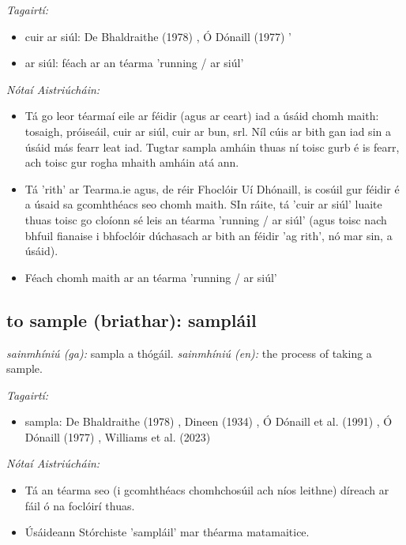 \documentclass{article}
\begin{document}
 \noindent \textit{Tagairtí:}
\begin{itemize}
	\item cuir ar siúl: De Bhaldraithe (1978) \cite{de-bhaldraithe}, Ó Dónaill (1977) \cite{odonaill}'
	\item ar siúl: féach ar an téarma 'running / ar siúl'
\end{itemize}

 \noindent \textit{Nótaí Aistriúcháin:}
\begin{itemize}
	\item Tá go leor téarmaí eile ar féidir (agus ar ceart) iad a úsáid chomh maith: tosaigh, próiseáil, cuir ar siúl, cuir ar bun, srl. Níl cúis ar bith gan iad sin a úsáid más fearr leat iad. Tugtar sampla amháin thuas ní toisc gurb é is fearr, ach toisc gur rogha mhaith amháin atá ann.
	\item Tá 'rith' ar Tearma.ie agus, de réir Fhoclóir Uí Dhónaill, is cosúil gur féidir é a úsaid sa gcomhthéacs seo chomh maith. SIn ráite, tá 'cuir ar siúl' luaite thuas toisc go cloíonn sé leis an téarma 'running / ar siúl' (agus toisc nach bhfuil fianaise i bhfoclóir dúchasach ar bith an féidir 'ag rith', nó mar sin, a úsáid).
	\item Féach chomh maith ar an téarma 'running / ar siúl'
\end{itemize}


\subsection*{to sample (briathar): sampláil} 
 \noindent \textit{sainmhíniú (ga):} sampla a thógáil.
\newline\newline
 \noindent \textit{sainmhíniú (en):} the process of taking a sample.
\newline

 \noindent \textit{Tagairtí:}
\begin{itemize}
	\item sampla: De Bhaldraithe (1978) \cite{de-bhaldraithe}, Dineen (1934) \cite{dineen}, Ó Dónaill et al. (1991) \cite{focloir-beag}, Ó Dónaill (1977) \cite{odonaill}, Williams et al. (2023) \cite{storchiste}
\end{itemize}

 \noindent \textit{Nótaí Aistriúcháin:}
\begin{itemize}
	\item Tá an téarma seo (i gcomhthéacs chomhchosúil ach níos leithne) díreach ar fáil ó na foclóirí thuas.
	\item Úsáideann Stórchiste 'sampláil' mar théarma matamaitice.
\end{itemize}
\end{document}
